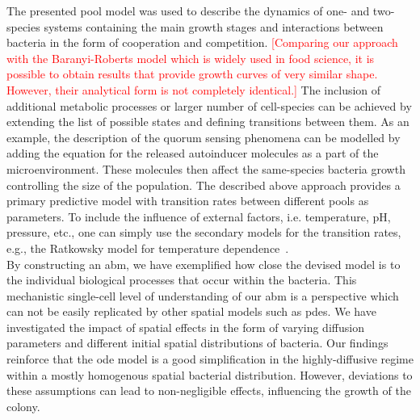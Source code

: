 \documentclass[10pt,twocolumn,5p]{elsarticle}
\numberwithin{equation}{section}
\newcommand{\cmt}[1]{\textcolor{red} {[#1]}}
\begin{document}
The presented pool model was used to describe the dynamics of one- and two-species systems containing the main growth stages and interactions between bacteria in the form of cooperation and competition.
\cmt{Comparing our approach with the Baranyi-Roberts model which is widely used in food science, it is possible
to obtain results that provide growth curves of very similar shape. However, their analytical form is not completely identical.}
The inclusion of additional metabolic processes or larger number of cell-species can be achieved by extending the list of possible states and defining transitions between them.
As an example, the description of the quorum sensing phenomena can be modelled by adding the equation for the released autoinducer molecules as a part of the microenvironment.
These molecules then affect the same-species bacteria growth controlling the size of the population.
The described above approach provides a primary predictive model with transition rates between different pools as parameters.
To include the influence of external factors, i.e. temperature, pH, pressure, etc., one can simply use the secondary models for the transition rates, e.g., the Ratkowsky model for temperature dependence~\cite{ratkowsky_relationship_1982}.\\
By constructing an \ac{abm}, we have exemplified how close the devised model is to the individual biological 
processes that occur within the bacteria.
This mechanistic single-cell level of understanding of our \ac{abm} is a perspective which can not be easily replicated by other spatial models such as \acp{pde}.
We have investigated the impact of spatial effects in the form of varying diffusion parameters and different initial spatial distributions of bacteria.
Our findings reinforce that the \ac{ode} model is a good simplification in the highly-diffusive regime within a mostly homogenous spatial bacterial distribution.
However, deviations to these assumptions can lead to non-negligible effects, influencing the growth of the colony.

\end{document}
